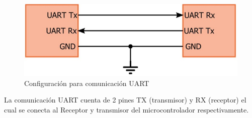 \begin{figure}[H]
\centering
\includegraphics[scale=0.8]{figuras/bluetooth/uart.png}
\caption{Configuración para comunicación UART}
\label{UART}
\end{figure}

La comunicación UART cuenta de 2 pines TX (transmisor) y RX (receptor) el cual se conecta al Receptor y transmisor del microcontrolador respectivamente.

